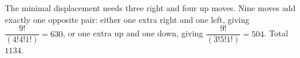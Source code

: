 The minimal displacement needs three right and four up moves. Nine moves add exactly one opposite pair: either one extra right and one left, giving $\dfrac{9!}{(4!4!1!)}=630$, or one extra up and one down, giving $\dfrac{9!}{(3!5!1!)}=504$. Total $\boxed{1134}$.

